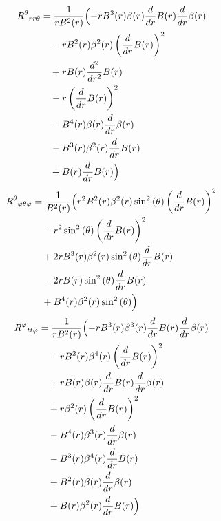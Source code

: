 \documentclass[11pt,a4paper]{article}
\newcommand{\riemann}[4]{R^{#1}{}_{#2 #3 #4}}
\begin{document}
\begin{align*}
  \riemann{\theta}{r}{r}{\theta} &= \frac{1}{r B^{2}{\left(r \right)}}\Bigl(- r B^{3}{\left(r \right)} \beta{\left(r \right)} \frac{d}{d r} B{\left(r \right)} \frac{d}{d r} \beta{\left(r \right)} \\
  &\quad - r B^{2}{\left(r \right)} \beta^{2}{\left(r \right)} \left(\frac{d}{d r} B{\left(r \right)}\right)^{2} \\
  &\quad + r B{\left(r \right)} \frac{d^{2}}{d r^{2}} B{\left(r \right)} \\
  &\quad - r \left(\frac{d}{d r} B{\left(r \right)}\right)^{2} \\
  &\quad - B^{4}{\left(r \right)} \beta{\left(r \right)} \frac{d}{d r} \beta{\left(r \right)} \\
  &\quad - B^{3}{\left(r \right)} \beta^{2}{\left(r \right)} \frac{d}{d r} B{\left(r \right)} \\
  &\quad + B{\left(r \right)} \frac{d}{d r} B{\left(r \right)}\Bigr)
\end{align*}
\begin{align*}
  \riemann{\theta}{\varphi}{\theta}{\varphi} &= \frac{1}{B^{2}{\left(r \right)}}\Bigl(r^{2} B^{2}{\left(r \right)} \beta^{2}{\left(r \right)} \sin^{2}{\left(\theta \right)} \left(\frac{d}{d r} B{\left(r \right)}\right)^{2} \\
  &\quad - r^{2} \sin^{2}{\left(\theta \right)} \left(\frac{d}{d r} B{\left(r \right)}\right)^{2} \\
  &\quad + 2 r B^{3}{\left(r \right)} \beta^{2}{\left(r \right)} \sin^{2}{\left(\theta \right)} \frac{d}{d r} B{\left(r \right)} \\
  &\quad - 2 r B{\left(r \right)} \sin^{2}{\left(\theta \right)} \frac{d}{d r} B{\left(r \right)} \\
  &\quad + B^{4}{\left(r \right)} \beta^{2}{\left(r \right)} \sin^{2}{\left(\theta \right)}\Bigr)
\end{align*}
\begin{align*}
  \riemann{\varphi}{t}{t}{\varphi} &= \frac{1}{r B^{2}{\left(r \right)}}\Bigl(- r B^{3}{\left(r \right)} \beta^{3}{\left(r \right)} \frac{d}{d r} B{\left(r \right)} \frac{d}{d r} \beta{\left(r \right)} \\
  &\quad - r B^{2}{\left(r \right)} \beta^{4}{\left(r \right)} \left(\frac{d}{d r} B{\left(r \right)}\right)^{2} \\
  &\quad + r B{\left(r \right)} \beta{\left(r \right)} \frac{d}{d r} B{\left(r \right)} \frac{d}{d r} \beta{\left(r \right)} \\
  &\quad + r \beta^{2}{\left(r \right)} \left(\frac{d}{d r} B{\left(r \right)}\right)^{2} \\
  &\quad - B^{4}{\left(r \right)} \beta^{3}{\left(r \right)} \frac{d}{d r} \beta{\left(r \right)} \\
  &\quad - B^{3}{\left(r \right)} \beta^{4}{\left(r \right)} \frac{d}{d r} B{\left(r \right)} \\
  &\quad + B^{2}{\left(r \right)} \beta{\left(r \right)} \frac{d}{d r} \beta{\left(r \right)} \\
  &\quad + B{\left(r \right)} \beta^{2}{\left(r \right)} \frac{d}{d r} B{\left(r \right)}\Bigr)
\end{align*}
\end{document}
